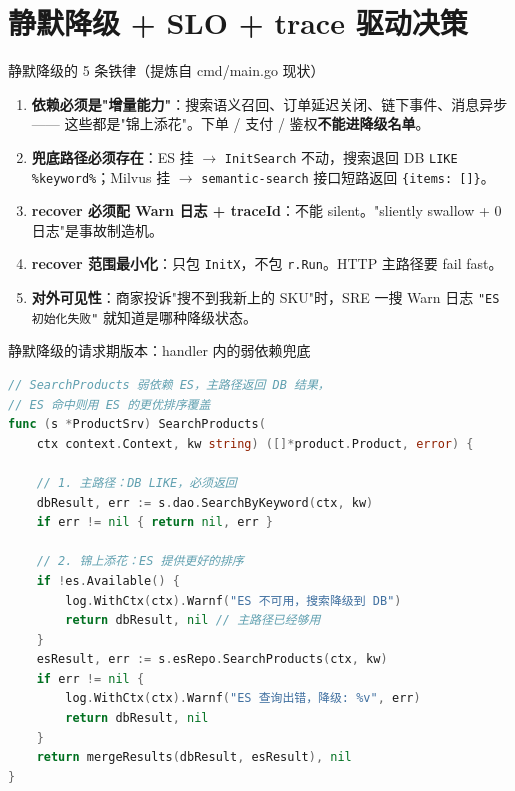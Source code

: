 \documentclass[aspectratio=169,11pt]{beamer}
\begin{document}
\section{静默降级 + SLO + trace 驱动决策}

\begin{frame}[shrink]{静默降级的 5 条铁律（提炼自 cmd/main.go 现状）}
\begin{enumerate}
  \item \textbf{依赖必须是"增量能力"}：搜索语义召回、订单延迟关闭、链下事件、消息异步 —— 这些都是"锦上添花"。下单 / 支付 / 鉴权\textbf{不能进降级名单}。
  \item \textbf{兜底路径必须存在}：ES 挂 $\to$ \texttt{InitSearch} 不动，搜索退回 DB \texttt{LIKE \%keyword\%}；Milvus 挂 $\to$ \texttt{semantic-search} 接口短路返回 \texttt{\{items: []\}}。
  \item \textbf{recover 必须配 Warn 日志 + traceId}：不能 silent。"sliently swallow + 0 日志"是事故制造机。
  \item \textbf{recover 范围最小化}：只包 \texttt{InitX}，不包 \texttt{r.Run}。HTTP 主路径要 fail fast。
  \item \textbf{对外可见性}：商家投诉"搜不到我新上的 SKU"时，SRE 一搜 Warn 日志 \texttt{"ES 初始化失败"} 就知道是哪种降级状态。
\end{enumerate}
\end{frame}

\begin{frame}{静默降级的请求期版本：handler 内的弱依赖兜底}
\begin{lstlisting}[language=Go,firstnumber=1,
  caption={}]
// SearchProducts 弱依赖 ES，主路径返回 DB 结果，
// ES 命中则用 ES 的更优排序覆盖
func (s *ProductSrv) SearchProducts(
    ctx context.Context, kw string) ([]*product.Product, error) {

    // 1. 主路径：DB LIKE，必须返回
    dbResult, err := s.dao.SearchByKeyword(ctx, kw)
    if err != nil { return nil, err }

    // 2. 锦上添花：ES 提供更好的排序
    if !es.Available() {
        log.WithCtx(ctx).Warnf("ES 不可用，搜索降级到 DB")
        return dbResult, nil // 主路径已经够用
    }
    esResult, err := s.esRepo.SearchProducts(ctx, kw)
    if err != nil {
        log.WithCtx(ctx).Warnf("ES 查询出错，降级: %v", err)
        return dbResult, nil
    }
    return mergeResults(dbResult, esResult), nil
}
\end{lstlisting}
\end{frame}
\end{document}
